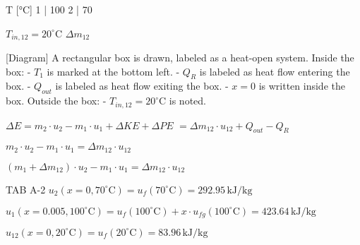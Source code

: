 T [°C]  
1 | 100  
2 | 70  

\( T_{in,12} = 20^\circ \text{C} \)  
\( \Delta m_{12} \)  

[Diagram]  
A rectangular box is drawn, labeled as a heat-open system. Inside the box:  
- \( T_1 \) is marked at the bottom left.  
- \( Q_{R} \) is labeled as heat flow entering the box.  
- \( Q_{out} \) is labeled as heat flow exiting the box.  
- \( x = 0 \) is written inside the box.  
Outside the box:  
- \( T_{in,12} = 20^\circ \text{C} \) is noted.  

\( \Delta E = m_2 \cdot u_2 - m_1 \cdot u_1 + \Delta KE + \Delta PE \)  
\( = \Delta m_{12} \cdot u_{12} + Q_{out} - Q_{R} \)  

\( m_2 \cdot u_2 - m_1 \cdot u_1 = \Delta m_{12} \cdot u_{12} \)  

\( (m_1 + \Delta m_{12}) \cdot u_2 - m_1 \cdot u_1 = \Delta m_{12} \cdot u_{12} \)  

TAB A-2  
\( u_2 (x = 0, 70^\circ \text{C}) = u_f (70^\circ \text{C}) = 292.95 \, \text{kJ/kg} \)  

\( u_1 (x = 0.005, 100^\circ \text{C}) = u_f (100^\circ \text{C}) + x \cdot u_{fg} (100^\circ \text{C}) = 423.64 \, \text{kJ/kg} \)  

\( u_{12} (x = 0, 20^\circ \text{C}) = u_f (20^\circ \text{C}) = 83.96 \, \text{kJ/kg} \)